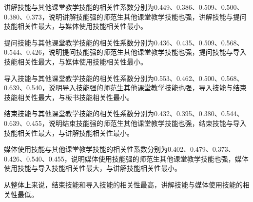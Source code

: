 讲解技能与其他课堂教学技能的相关性系数分别为0.449、0.386、0.509、0.500、0.380、0.373，说明讲解技能强的师范生其他课堂教学技能也强，讲解技能与提问技能相关性最大，与媒体使用技能相关性最小。

提问技能与其他课堂教学技能的相关性系数分别为0.436、0.435、0.509、0.568、0.544、0.426，说明提问技能强的师范生其他课堂教学技能也强，提问技能与导入技能相关性最大，与媒体使用技能相关性最小。

导入技能与其他课堂教学技能的相关性系数分别为0.553、0.462、0.500、0.568、0.639、0.540，说明导入技能强的师范生其他课堂教学技能也强，导入技能与结束技能相关性最大，与板书技能相关性最小。

结束技能与其他课堂教学技能的相关性系数分别为0.432、0.395、0.380、0.544、0.639、0.455，说明结束技能强的师范生其他课堂教学技能也强，结束技能与导入技能相关性最大，与讲解技能相关性最小。

媒体使用技能与其他课堂教学技能的相关性系数分别为0.402、0.479、0.373、0.426、0.540、0.455，说明媒体使用技能强的师范生其他课堂教学技能也强，媒体使用技能与导入技能相关性最大，与讲解技能相关性最小。

从整体上来说，结束技能和导入技能的相关性最高，讲解技能与媒体使用技能的相关性最低。